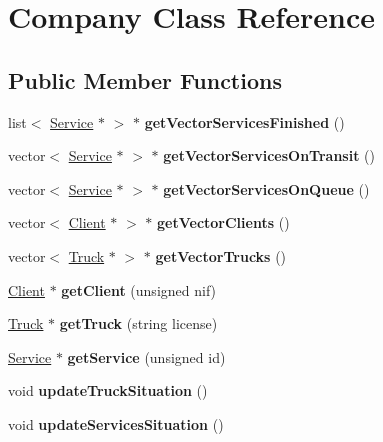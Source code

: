 \hypertarget{class_company}{}\section{Company Class Reference}
\label{class_company}
\subsection*{Public Member Functions}
\begin{DoxyCompactItemize}
\item 
\mbox{\label{class_company_ab018a747472dbb17d07e85d17dc17912}} 
list$<$ \hyperlink{class_service}{Service} $\ast$ $>$ $\ast$ {\bfseries get\+Vector\+Services\+Finished} ()
\item 
\mbox{\label{class_company_ab83ddbd16558f0e99efa7c56878e0ec8}} 
vector$<$ \hyperlink{class_service}{Service} $\ast$ $>$ $\ast$ {\bfseries get\+Vector\+Services\+On\+Transit} ()
\item 
\mbox{\label{class_company_adffe3680413d999c922858c88fbd18a6}} 
vector$<$ \hyperlink{class_service}{Service} $\ast$ $>$ $\ast$ {\bfseries get\+Vector\+Services\+On\+Queue} ()
\item 
\mbox{\label{class_company_a16693c2e4bf9a932e15926c37c21485f}} 
vector$<$ \hyperlink{class_client}{Client} $\ast$ $>$ $\ast$ {\bfseries get\+Vector\+Clients} ()
\item 
\mbox{\label{class_company_a78feb735977ce59f253a30082dbf24b6}} 
vector$<$ \hyperlink{class_truck}{Truck} $\ast$ $>$ $\ast$ {\bfseries get\+Vector\+Trucks} ()
\item 
\mbox{\label{class_company_ae8efdaf521467fd204c8d272f4469679}} 
\hyperlink{class_client}{Client} $\ast$ {\bfseries get\+Client} (unsigned nif)
\item 
\mbox{\label{class_company_acb9c7285e4ca619899017bd1221a1d27}} 
\hyperlink{class_truck}{Truck} $\ast$ {\bfseries get\+Truck} (string license)
\item 
\mbox{\label{class_company_acf80072e8abec3e359387243d8cdc49f}} 
\hyperlink{class_service}{Service} $\ast$ {\bfseries get\+Service} (unsigned id)
\item 
\mbox{\label{class_company_af058ee612ca75f1bbd6507e078e5de0a}} 
void {\bfseries update\+Truck\+Situation} ()
\item 
\mbox{\label{class_company_ae5ce2e4c8d26951b71ca73c7589f6875}} 
void {\bfseries update\+Services\+Situation} ()
\end{DoxyCompactItemize}
